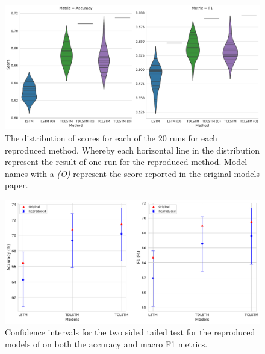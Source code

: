 \begin{figure}[!h]
    \centering
    \includegraphics[scale=0.42]{images/reproducibility/tang/LSTM_DIST_ACC_F1_COMBINED.pdf}
    \caption{The distribution of scores for each of the $20$ runs for each reproduced method. Whereby each horizontal line in the distribution represent the result of one run for the reproduced method. Model names with a \textit{(O)} represent the score reported in the original models paper.}
    \label{fig:repro_tang_LSTM_DIST_ACC_F1}
\end{figure}

\begin{figure}[!h]
    \centering
    \includegraphics[scale=0.4]{images/reproducibility/tang/LSTM_ACC_F1.pdf}
    \caption{Confidence intervals for the two sided tailed test for the reproduced models of \citet{tang-etal-2016-effective} on both the accuracy and macro F1 metrics.}
    \label{fig:repro_tang_LSTM_ACC_F1}
\end{figure}

